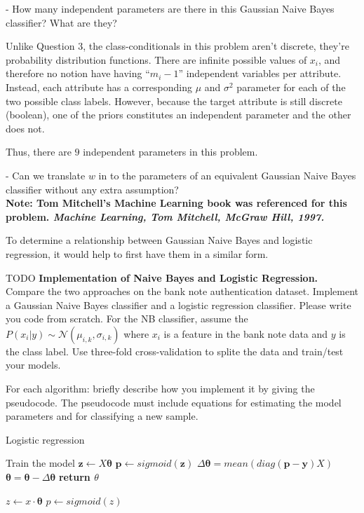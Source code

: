 \documentclass[11pt,largemargins]{homework}
\begin{document}
\begin{alphaparts}
	\questionpart
	- How many independent parameters are there in this Gaussian Naive Bayes classifier? What are they?

	Unlike Question 3, the class-conditionals in this problem aren't discrete, they're probability distribution functions. There are infinite possible values of $x_i$, and therefore no notion have having ``$m_i-1$'' independent variables per attribute. Instead, each attribute has a corresponding $\mu$ and $\sigma^2$ parameter for each of the two possible class labels. However, because the target attribute is still discrete (boolean), one of the priors constitutes an independent parameter and the other does not.

	Thus, there are $9$ independent parameters in this problem.

	- Can we translate $w$ in to the parameters of an equivalent Gaussian Naive Bayes classifier without any extra assumption?\\
	{\footnotesize\bf
		Note:  Tom Mitchell's Machine Learning book was referenced for this problem.
		{\itshape 
			Machine Learning, Tom Mitchell, McGraw Hill, 1997.
		}
	}


	To determine a relationship between Gaussian Naive Bayes and logistic regression, it would help to first have them in a similar form. 

	TODO
	\questionpart
\textbf{Implementation of Naive Bayes and Logistic Regression.} Compare the two approaches on the bank note authentication dataset. Implement a Gaussian Naive Bayes classifier and a logistic regression classifier. Please write you code from scratch. For the NB classifier, assume the $P(x_i|y)\sim\mathcal{N}(\mu_{i, k}, \sigma_{i, k})$ where $x_i$ is a feature in the bank note data and $y$ is the class label. Use three-fold cross-validation to splite the data and train/test your models.
\begin{arabicparts}
	\questionpart
	For each algorithm: briefly describe how you implement it by giving the pseudocode. The pseudocode must include equations for estimating the model parameters and for classifying a new sample.
	
	\begin{algorithm}
		\caption{Logistic regression}
		\begin{algorithmic}
			\Comment Train the model
				\State $\mathbf{z}\gets X\mathbf{\theta}$
				\State $\mathbf{p} \gets sigmoid(\mathbf{z})$
				\State $\Delta\mathbf{\theta}=mean(diag(\mathbf{p}-\mathbf{y})X)$
				\State $\mathbf{\theta}=\mathbf{\theta} - \Delta\mathbf{\theta}$
				\EndFor
				\State \textbf{return $\theta$}
			\EndProcedure
			\item[]
				\State $z\gets x\cdot\mathbf{\theta}$
				\State $p \gets sigmoid(z)$
				\State {}
				\Else
				\State {}
			\EndProcedure
		\end{algorithmic}
	\end{algorithm}

\end{arabicparts}
\end{alphaparts}
\end{document}
